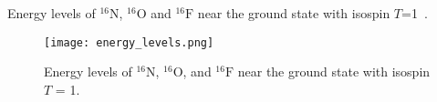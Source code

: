 \documentclass[12pt]{article}
\begin{document}
Energy levels of ${}^{16}\mathrm{N}$, ${}^{16}\mathrm{O}$ and ${}^{16}\mathrm{F}$ near the ground state with isospin $T$=1~\cite{ENSDF}. 

\begin{figure}[h]
    \centering
    \texttt{[image: energy\_levels.png]} %
    \caption{Energy levels of \({}^{16}\mathrm{N}\), \({}^{16}\mathrm{O}\), and \({}^{16}\mathrm{F}\) near the ground state with isospin \(T\) = 1.}
    \label{fig:energy_levels}
\end{figure}

% 
% 
\end{document}
